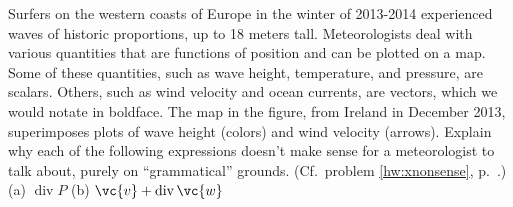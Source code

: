 Surfers on the western coasts of Europe in the winter of 2013-2014
experienced waves of historic proportions, up to 18 meters tall.
Meteorologists deal with various quantities that are functions of
position and can be plotted on a map.  Some of these quantities, such
as wave height, temperature, and pressure, are scalars. Others, such
as wind velocity and ocean currents, are vectors, which we would
notate in boldface.  The map in the figure, from Ireland in December
2013, superimposes plots of wave height (colors) and wind velocity
(arrows). Explain why each of the following expressions doesn't make
sense for a meteorologist to talk about, purely on ``grammatical'' grounds.
(Cf.~problem \ref{hw:xnonsense}, p.~\pageref{hw:xnonsense}.)\\
(a) $\operatorname{div} P$\hwendpart
(b) $\vc{v}+\operatorname{div} \vc{w}$
